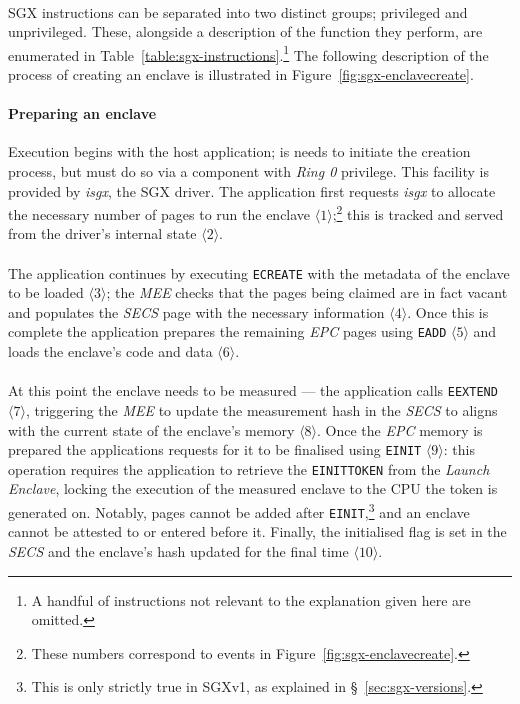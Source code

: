 \paragraph{} SGX instructions can be separated into two distinct groups; privileged and unprivileged. These, alongside a description of the function they perform, are enumerated in Table~\ref{table:sgx-instructions}.\footnote{A handful of instructions not relevant to the explanation given here are omitted.} The following description of the process of creating an enclave is illustrated in Figure~\ref{fig:sgx-enclavecreate}.

\paragraph{Preparing an enclave} Execution begins with the host application; is needs to initiate the creation process, but must do so via a component with \textit{Ring 0} privilege. This facility is provided by \textit{isgx}, the SGX driver. The application first requests \textit{isgx} to allocate the necessary number of pages to run the enclave $\langle 1 \rangle$;\footnote{These numbers correspond to events in Figure~\ref{fig:sgx-enclavecreate}.} this is tracked and served from the driver's internal state $\langle 2 \rangle$.

\paragraph{} The application continues by executing \texttt{ECREATE} with the metadata of the enclave to be loaded $\langle 3 \rangle$; the \textit{MEE} checks that the pages being claimed are in fact vacant and populates the \textit{SECS} page with the necessary information $\langle 4 \rangle$. Once this is complete the application prepares the remaining \textit{EPC} pages using \texttt{EADD} $\langle 5 \rangle$ and loads the enclave's code and data $\langle 6 \rangle$.

\paragraph{} At this point the enclave needs to be measured --- the application calls \texttt{EEXTEND} $\langle 7 \rangle$, triggering the \textit{MEE} to update the measurement hash in the \textit{SECS} to aligns with the current state of the enclave's memory $\langle 8 \rangle$. Once the \textit{EPC} memory is prepared the applications requests for it to be finalised using \texttt{EINIT} $\langle 9 \rangle$: this operation requires the application to retrieve the \texttt{EINITTOKEN} from the \textit{Launch Enclave}, locking the execution of the measured enclave to the CPU the token is generated on. Notably, pages cannot be added after \texttt{EINIT},\footnote{This is only strictly true in SGXv1, as explained in §~\ref{sec:sgx-versions}.} and an enclave cannot be attested to or entered before it. Finally, the initialised flag is set in the \textit{SECS} and the enclave's hash updated for the final time $\langle 10 \rangle$.


